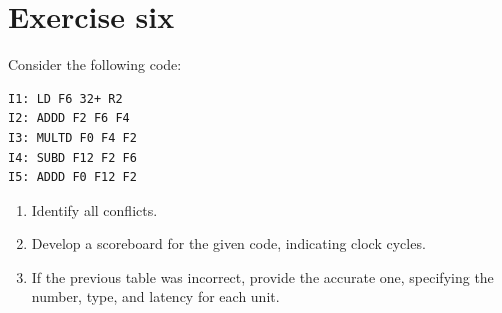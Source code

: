 \section{Exercise six}

Consider the following code:
\begin{verbatim}
I1: LD F6 32+ R2
I2: ADDD F2 F6 F4
I3: MULTD F0 F4 F2
I4: SUBD F12 F2 F6
I5: ADDD F0 F12 F2
\end{verbatim}
\begin{enumerate}
    \item Identify all conflicts.
    \item Develop a scoreboard for the given code, indicating clock cycles.
    \item If the previous table was incorrect, provide the accurate one, specifying the number, type, and latency for each unit.
\end{enumerate}

